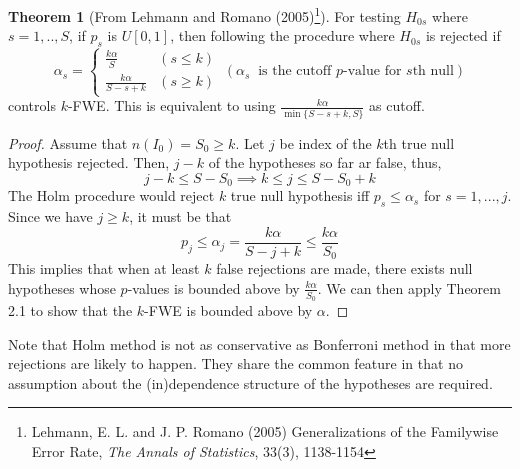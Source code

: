 \documentclass[12pt]{article}
\theoremstyle{definition}
\theoremstyle{property}
\theoremstyle{assumption}
\theoremstyle{example}
\theoremstyle{comment}
\newtheorem{theorem}{Theorem}[section]
\begin{document}
\begin{mdframed}[backgroundcolor=green!5] 
\begin{theorem}[From Lehmann and Romano (2005)\footnote{Lehmann, E. L. and J. P. Romano (2005) Generalizations of the Familywise Error Rate, \textit{The Annals of Statistics}, 33(3), 1138-1154}]  For testing $H_{0s}$ where $s=1,..,S$, if $p_s$ is $U[0,1]$, then following the procedure where $H_{0s}$ is rejected if
\[
\alpha_s = \begin{cases}\frac{k\alpha}{S} & (s\leq k)\\ \frac{k\alpha}{S-s+k}& (s\geq k) \end{cases} \ (\alpha_s \ \text{ is the cutoff $p$-value for $s$th null})
\] controls $k$-FWE. This is equivalent to using $\frac{k\alpha}{\min\{S-s+k, S\}}$ as cutoff.
\begin{proof}
Assume that $n(I_0)=S_0\geq k$. Let $j$ be index of the $k$th true null hypothesis rejected. Then, $j-k$ of the hypotheses so far ar false, thus, 
\[
j-k\leq S-S_0 \implies k\leq j \leq S-S_0+k
\]
The Holm procedure would reject $k$ true null hypothesis iff $p_s \leq \alpha_s$ for $s=1,...,j$. Since we have $j\geq k$, it must be that
\[
p_j \leq \alpha_j =\frac{k\alpha}{S-j+k}\leq \frac{k\alpha}{S_0}
\]
This implies that when at least $k$ false rejections are made, there exists null hypotheses whose $p$-values is bounded above by $\frac{k\alpha}{S_0}$. We can then apply Theorem 2.1 to show that the $k$-FWE is bounded above by $\alpha$.
\end{proof}
\end{theorem}
\end{mdframed} \par
Note that Holm method is not as conservative as Bonferroni method in that more rejections are likely to happen. They share the common feature in that no assumption about the (in)dependence structure of the hypotheses are required. 
\end{document}
